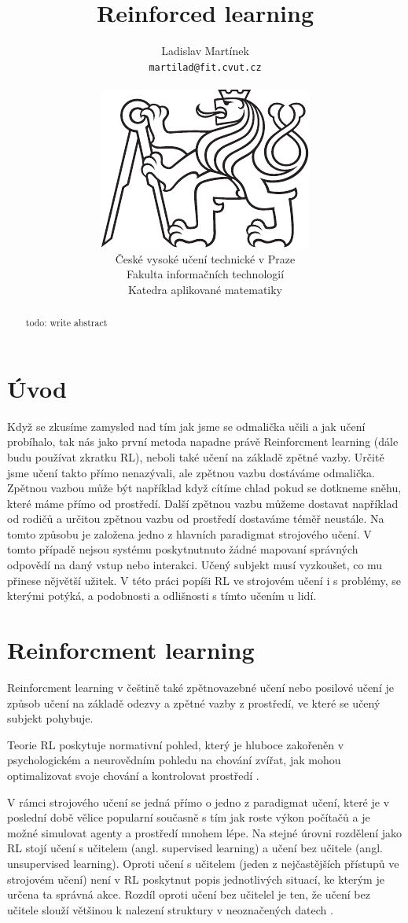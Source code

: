 \documentclass{article}
\title{Reinforced learning}
\author{
  Ladislav Martínek\\
  \texttt{martilad@fit.cvut.cz} \\
  \\
  \includegraphics[width=.16\textwidth]{./img/cvut-logo-bw}
  \\
  České vysoké učení technické v Praze\\
  Fakulta informačních technologií\\
  Katedra aplikované matematiky\\  
}
\begin{document}
\maketitle

\begin{abstract}
todo: write abstract
\end{abstract}




\section{Úvod}
Když se zkusíme zamysled nad tím jak jsme se odmalička učili a jak učení probíhalo, tak nás jako první metoda napadne právě Reinforcment learning (dále budu používat zkratku RL), neboli také učení na základě zpětné vazby. Určitě jsme učení takto přímo nenazývali, ale zpětnou vazbu dostáváme odmalička. Zpětnou vazbou může být například když cítíme chlad pokud se dotkneme sněhu, které máme přímo od prostředí. Další zpětnou vazbu můžeme dostavat například od rodičů a určitou zpětnou vazbu od prostředí dostaváme téměř neustále. Na tomto způsobu je založena jedno z hlavních paradigmat strojového učení. V tomto případě nejsou systému poskytnutnuto žádné mapovaní správných odpovědí na daný vstup nebo interakci. Učený subjekt musí vyzkoušet, co mu přinese nějvětší užitek. V této práci popíši RL ve strojovém učení i s problémy, se kterými potýká, a podobnosti a odlišnosti s tímto učením u lidí. 


\section{Reinforcment learning}
\label{sec:headings}

Reinforcment learning v češtině také zpětnovazebné učení nebo posilové učení je způsob učení na základě odezvy a zpětné vazby z prostředí, ve které se učený subjekt pohybuje. 

Teorie RL poskytuje normativní pohled, který je hluboce zakořeněn v psychologickém a neurovědním pohledu na chování zvířat, jak mohou optimalizovat svoje chování a kontrolovat prostředí \cite{mnih2015human}. 

V rámci strojového učení se jedná přímo o jedno z paradigmat učení, které je v poslední době vělice popularní současně s tím jak roste výkon počítačů a je možné simulovat agenty a prostředí mnohem lépe. Na stejné úrovni rozdělení jako RL stojí učení s učitelem (angl. supervised learning) a učení bez učitele (angl. unsupervised learning). Oproti učení s učitelem (jeden z nejčastějších přístupů ve strojovém učení) není v RL poskytnut popis jednotlivých situací, ke kterým je určena ta správná akce. Rozdíl oproti učení bez učitelel je ten, že učení bez učitele slouží většinou k nalezení struktury v neoznačených datech \cite{sutton1998introduction}.
\end{document}
